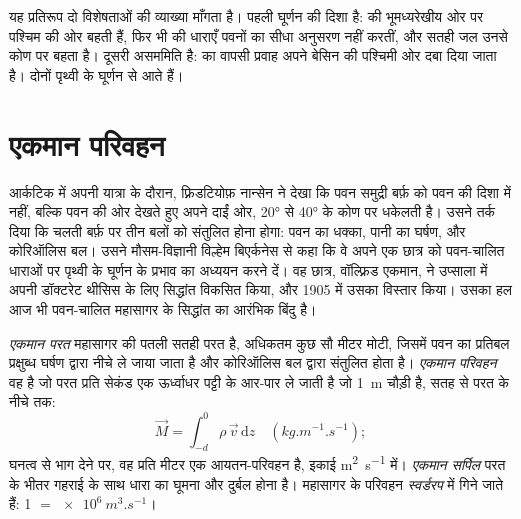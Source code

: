 यह प्रतिरूप दो विशेषताओं की व्याख्या माँगता है। पहली घूर्णन की दिशा है:  की भूमध्यरेखीय ओर पर  पश्चिम की ओर बहती हैं, फिर भी  की धाराएँ पवनों का सीधा अनुसरण नहीं करतीं, और सतही जल उनसे कोण पर बहता है। दूसरी असममिति है:  का वापसी प्रवाह अपने बेसिन की पश्चिमी ओर दबा दिया जाता है। दोनों पृथ्वी के घूर्णन से आते हैं।

\section{एकमान परिवहन}\label{sec:b1:ocean-circulation:ekman}

\begin{history}[नान्सेन और एकमान, 1898--1905]
आर्कटिक में अपनी यात्रा के दौरान, फ़्रिडटियोफ़ नान्सेन ने देखा कि पवन समुद्री बर्फ़ को पवन की दिशा में नहीं, बल्कि पवन की ओर देखते हुए अपने दाईं ओर, \ang{20} से \ang{40} के कोण पर धकेलती है। उसने तर्क दिया कि चलती बर्फ़ पर तीन बलों को संतुलित होना होगा: पवन का धक्का, पानी का घर्षण, और कोरिऑलिस बल। उसने मौसम-विज्ञानी विल्हेम बिएर्कनेस से कहा कि वे अपने एक छात्र को पवन-चालित धाराओं पर पृथ्वी के घूर्णन के प्रभाव का अध्ययन करने दें। वह छात्र, वॉल्फ़्रिड एकमान, ने उप्साला में अपनी डॉक्टरेट थीसिस के लिए सिद्धांत विकसित किया, और 1905 में उसका विस्तार किया। उसका हल आज भी पवन-चालित महासागर के सिद्धांत का आरंभिक बिंदु है।
\end{history}

\begin{definition}\label{def:b1:ocean-circulation:ekman}
\emph{एकमान परत} महासागर की पतली सतही परत है, अधिकतम कुछ सौ मीटर मोटी, जिसमें पवन का प्रतिबल प्रक्षुब्ध घर्षण द्वारा नीचे ले जाया जाता है और कोरिऑलिस बल द्वारा संतुलित होता है। \emph{एकमान परिवहन} वह  है जो परत प्रति सेकंड एक ऊर्ध्वाधर पट्टी के आर-पार ले जाती है जो \qty{1}{m} चौड़ी है, सतह से परत के नीचे तक:
\[
  \vec M = \int_{-d}^{0} \rho\,\vec v\,\mathrm dz \quad (\unit{kg.m^{-1}.s^{-1}});
\]
घनत्व से भाग देने पर, वह प्रति मीटर एक आयतन-परिवहन है, इकाई \unit{m^2.s^{-1}} में। \emph{एकमान सर्पिल} परत के भीतर गहराई के साथ धारा का घूमना और दुर्बल होना है। महासागर के परिवहन \emph{स्वर्डरप} में गिने जाते हैं: \qty{1}{\sverdrup} $=
\qty{e6}{m^3.s^{-1}}$।
\end{definition}

